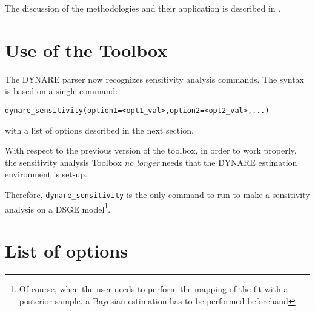 \documentclass[12pt,a4paper]{article}
\begin{document}
The discussion of the methodologies and their application is
described in \cite{Ratto_CompEcon_2008}.


\section{Use of the Toolbox}
The DYNARE parser now recognizes sensitivity analysis commands.
The syntax is based on a single command:
\vspace{0.5cm}

\verb"dynare_sensitivity(option1=<opt1_val>,option2=<opt2_val>,...)"

\vspace{0.5cm} \noindent with a list of options described in the
next section.

With respect to the previous version of the toolbox, in order to
work properly, the sensitivity analysis Toolbox \emph{no longer}
needs that the DYNARE estimation environment is set-up.

Therefore, \verb"dynare_sensitivity" is the only command to run to
make a sensitivity analysis on a DSGE model\footnote{Of course,
when the user needs to perform the mapping of the fit with a
posterior sample, a Bayesian estimation has to be performed
beforehand}.


\section{List of options}
\end{document}
